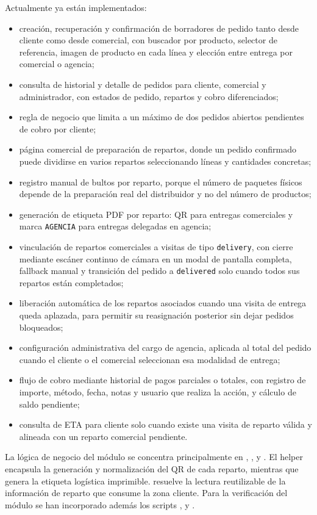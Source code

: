 Actualmente ya están implementados:

\begin{itemize}
    \item creación, recuperación y confirmación de borradores de pedido tanto desde cliente como desde comercial, con buscador por producto, selector de referencia, imagen de producto en cada línea y elección entre entrega por comercial o agencia;
    \item consulta de historial y detalle de pedidos para cliente, comercial y administrador, con estados de pedido, repartos y cobro diferenciados;
    \item regla de negocio que limita a un máximo de dos pedidos abiertos pendientes de cobro por cliente;
    \item página comercial de preparación de repartos, donde un pedido confirmado puede dividirse en varios repartos seleccionando líneas y cantidades concretas;
    \item registro manual de bultos por reparto, porque el número de paquetes físicos depende de la preparación real del distribuidor y no del número de productos;
    \item generación de etiqueta PDF por reparto: QR para entregas comerciales y marca \texttt{AGENCIA} para entregas delegadas en agencia;
    \item vinculación de repartos comerciales a visitas de tipo \texttt{delivery}, con cierre mediante escáner continuo de cámara en un modal de pantalla completa, fallback manual y transición del pedido a \texttt{delivered} solo cuando todos sus repartos están completados;
    \item liberación automática de los repartos asociados cuando una visita de entrega queda aplazada, para permitir su reasignación posterior sin dejar pedidos bloqueados;
    \item configuración administrativa del cargo de agencia, aplicada al total del pedido cuando el cliente o el comercial seleccionan esa modalidad de entrega;
    \item flujo de cobro mediante historial de pagos parciales o totales, con registro de importe, método, fecha, notas y usuario que realiza la acción, y cálculo de saldo pendiente;
    \item consulta de ETA para cliente solo cuando existe una visita de reparto válida y alineada con un reparto comercial pendiente.
\end{itemize}

La lógica de negocio del módulo se concentra principalmente en , ,  y . El helper  encapsula la generación y normalización del QR de cada reparto, mientras que  genera la etiqueta logística imprimible.  resuelve la lectura reutilizable de la información de reparto que consume la zona cliente. Para la verificación del módulo se han incorporado además los scripts ,  y .

